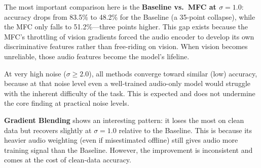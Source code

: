\documentclass[10pt, twocolumn, letterpaper]{article}
\begin{document}
\begin{table}[h]
\centering
{}
\caption{\textbf{Robustness to Visual Noise.} Accuracy (on the held-out validation set) as Gaussian noise of increasing standard deviation $\sigma$ is added to the visual input at test time. Clean audio is always available. The MFC and OGM-GE both achieve notably better resilience than the Baseline at moderate noise levels ($\sigma \leq 1.0$), confirming that their audio encoders have learned genuinely useful features rather than remaining dormant.}
\label{tab:robustness}
\end{table}

The most important comparison here is the \textbf{Baseline vs.\ MFC at $\sigma = 1.0$}: accuracy drops from 83.5\% to 48.2\% for the Baseline (a 35-point collapse), while the MFC only falls to 51.2\%—three points higher. This gap exists because the MFC's throttling of vision gradients forced the audio encoder to develop its own discriminative features rather than free-riding on vision. When vision becomes unreliable, those audio features become the model's lifeline.

At very high noise ($\sigma \geq 2.0$), all methods converge toward similar (low) accuracy, because at that noise level even a well-trained audio-only model would struggle with the inherent difficulty of the task. This is expected and does not undermine the core finding at practical noise levels.

\textbf{Gradient Blending} shows an interesting pattern: it loses the most on clean data but recovers slightly at $\sigma = 1.0$ relative to the Baseline. This is because its heavier audio weighting (even if misestimated offline) still gives audio more training signal than the Baseline. However, the improvement is inconsistent and comes at the cost of clean-data accuracy.
\end{document}
